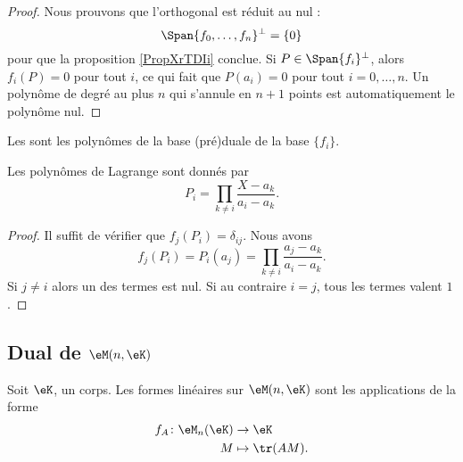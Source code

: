 \begin{proof}
    Nous prouvons que l'orthogonal est réduit au nul :
    \begin{equation}
        \Span\{ f_0,\ldots, f_n \}^{\perp}=\{ 0 \}
    \end{equation}
    pour que la proposition \ref{PropXrTDIi} conclue. Si \( P\in\Span\{ f_i \}^{\perp}\), alors \( f_i(P)=0\) pour tout \( i\), ce qui fait que \( P(a_i)=0\) pour tout \( i=0,\ldots, n\). Un polynôme de degré au plus \( n\) qui s'annule en \( n+1\) points est automatiquement le polynôme nul.
\end{proof}

Les  sont les polynômes de la base (pré)duale de la base \( \{ f_i \}\).

\begin{proposition}
    Les polynômes de Lagrange sont donnés par
    \begin{equation}
        P_i=\prod_{k\neq i}\frac{ X-a_k }{ a_i-a_k }.
    \end{equation}
\end{proposition}

\begin{proof}
    Il suffit de vérifier que \( f_j(P_i)=\delta_{ij}\). Nous avons
    \begin{equation}
        f_j(P_i)=P_i(a_j)=\prod_{k\neq i}\frac{ a_j-a_k }{ a_i-a_k }.
    \end{equation}
    Si \( j\neq i\) alors un des termes est nul. Si au contraire \( i=j\), tous les termes valent \( 1\).
\end{proof}

\subsection{Dual de \texorpdfstring{$ \eM(n,\eK)$}{M(n,K)}}

\begin{proposition}     \label{PropHOjJpCa}
    Soit \( \eK\), un corps. Les formes linéaires sur \( \eM(n,\eK)\) sont les applications de la forme
    \begin{equation}
        \begin{aligned}
            f_A\colon \eM_n(\eK)&\to \eK \\
            M&\mapsto \tr(AM). 
        \end{aligned}
    \end{equation}
\end{proposition}


